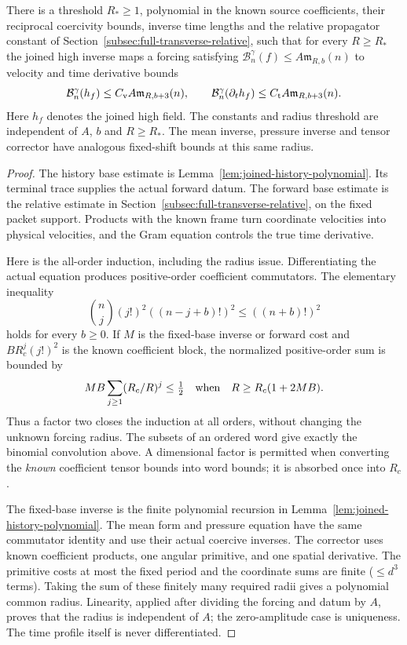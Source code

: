 \begin{lemma}\label{lem:joined-same-radius}
There is a threshold $R_*\geq1$, polynomial in the known source coefficients,
their reciprocal coercivity bounds, inverse time lengths and the relative
propagator constant of Section~\ref{subsec:full-transverse-relative}, such that
for every $R\geq R_*$ the joined high inverse maps a forcing satisfying
$\mathcal B_n^\gamma(f)\leq A\mathfrak m_{R,b}(n)$ to velocity and
time derivative bounds
\[
 \mathcal B_n^\gamma(h_f)\leq C_{\rm v}A\mathfrak m_{R,b+3}(n),\qquad
 \mathcal B_n^\gamma(\partial_t h_f)\leq C_{\rm t}A\mathfrak m_{R,b+3}(n).
\]
Here $h_f$ denotes the joined high field. The constants and radius
threshold are independent of $A$, $b$ and $R\geq R_*$. The
mean inverse, pressure inverse and tensor corrector have analogous
fixed-shift bounds at this same radius.
\end{lemma}
\begin{proof}
The history base estimate is Lemma~\ref{lem:joined-history-polynomial}.
Its terminal trace supplies the actual forward datum. The forward
base estimate is the relative estimate in Section~\ref{subsec:full-transverse-relative}, on the
fixed packet support. Products with the known frame turn coordinate
velocities into physical velocities, and the Gram equation controls
the true time derivative.

Here is the all-order induction, including the radius issue. Differentiating
the actual equation produces positive-order coefficient commutators.
The elementary inequality
\[
 \binom nj(j!)^2((n-j+b)!)^2\leq((n+b)!)^2
\]
holds for every $b\geq0$. If $M$ is the fixed-base inverse or forward
cost and $B R_c^j(j!)^2$ is the known coefficient block, the normalized
positive-order sum is bounded by
\[
 MB\sum_{j\geq1}(R_c/R)^j\leq\tfrac12
 \quad\hbox{when}\quad R\geq R_c(1+2MB).
\]
Thus a factor two closes the induction at all orders, without changing
the unknown forcing radius. The subsets of an ordered word give exactly
the binomial convolution above. A dimensional factor is permitted when
converting the \emph{known} coefficient tensor bounds into word bounds;
it is absorbed once into $R_c$.

The fixed-base inverse is the finite polynomial recursion in
Lemma~\ref{lem:joined-history-polynomial}. The mean form and pressure
equation have the same commutator identity and use their actual coercive
inverses. The corrector uses known coefficient products, one angular
primitive, and one spatial derivative. The primitive costs at most
the fixed period and the coordinate sums are finite ($\leq d^3$
terms). Taking the sum of these finitely many required radii gives
a polynomial common radius. Linearity, applied after dividing the
forcing and datum by $A$, proves that the radius is independent of
$A$; the zero-amplitude case is uniqueness. The time profile itself
is never differentiated.
\end{proof}


